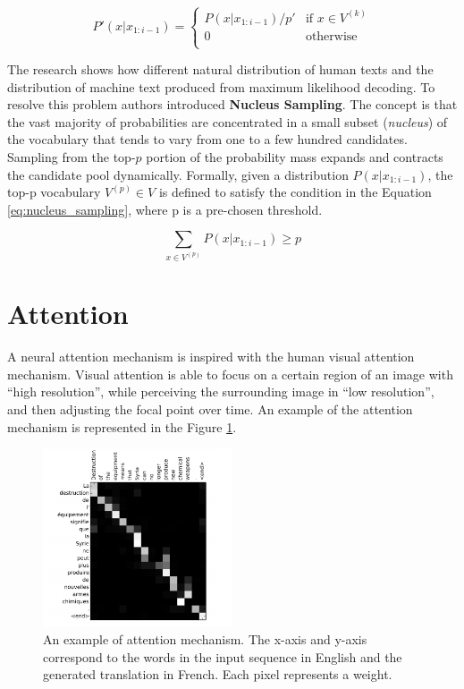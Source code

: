 \begin{equation} \label{eq:top_K_sampling}
P'(x|x_{1:i-1}) = \begin{cases} 
          P(x|x_{1:i-1}) / p' & \mbox{if $x \in V^{(k)}$} \\
          0 & \mbox{otherwise}\\
         \end{cases}
\end{equation}

The research \cite{holtzman2019curious} shows how different natural distribution of human texts and the distribution of machine text produced from maximum likelihood decoding. To resolve this problem authors introduced \textbf{Nucleus Sampling}. The concept is that the vast majority of probabilities are concentrated in a small subset (\textit{nucleus}) of the vocabulary that tends to vary from one to a few hundred candidates. Sampling from the top-$p$ portion of the probability mass expands and contracts the candidate pool dynamically. Formally, given a distribution $P(x|x_{1:i-1})$, the top-p vocabulary $V^{(p)} \in V$ is defined to satisfy the condition in the Equation \ref{eq:nucleus_sampling}, where p is a pre-chosen threshold.

\begin{equation} \label{eq:nucleus_sampling}
\sum_{x \in V^{(p)}} P(x|x_{1:i-1})  \geqslant p
\end{equation}

\section{Attention} \label{attention_section}
A neural attention mechanism is inspired with the human visual attention mechanism. Visual attention is able to focus on a certain region of an image with ``high resolution'', while perceiving the surrounding image in “low resolution”, and then adjusting the focal point over time. An example of the attention mechanism is represented in the Figure \ref{fig:attention}.

\begin{figure}[hbt]
  \centering
  \includegraphics[width=0.5\textwidth]{figures/attention_example.png}
  \caption{An example of attention mechanism. The x-axis and y-axis correspond to the words in the input sequence in English and the generated translation in French. Each pixel represents a weight.\protect\footnotemark}
  \label{fig:attention}
\end{figure}


